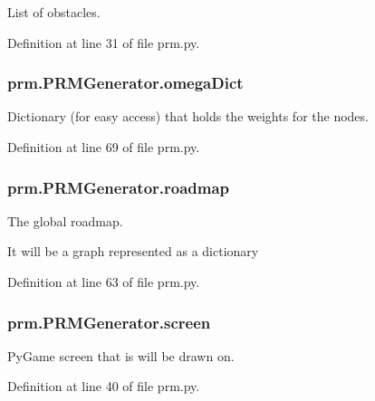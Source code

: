 List of obstacles. 



Definition at line 31 of file prm.\-py.

\hypertarget{classprm_1_1PRMGenerator_ad56b6bb5da1e474ab8a8099863207de3}{
\subsubsection[{omega\-Dict}]{\setlength{\rightskip}{0pt plus 5cm}prm.\-P\-R\-M\-Generator.\-omega\-Dict}}\label{classprm_1_1PRMGenerator_ad56b6bb5da1e474ab8a8099863207de3}


Dictionary (for easy access) that holds the weights for the nodes. 



Definition at line 69 of file prm.\-py.

\hypertarget{classprm_1_1PRMGenerator_a7fa851696426c3e1bbd7ff737cf33538}{
\subsubsection[{roadmap}]{\setlength{\rightskip}{0pt plus 5cm}prm.\-P\-R\-M\-Generator.\-roadmap}}\label{classprm_1_1PRMGenerator_a7fa851696426c3e1bbd7ff737cf33538}


The global roadmap. 

It will be a graph represented as a dictionary 

Definition at line 63 of file prm.\-py.

\hypertarget{classprm_1_1PRMGenerator_ab7fc7e3fa902029c3c3432ec0444be93}{
\subsubsection[{screen}]{\setlength{\rightskip}{0pt plus 5cm}prm.\-P\-R\-M\-Generator.\-screen}}\label{classprm_1_1PRMGenerator_ab7fc7e3fa902029c3c3432ec0444be93}


Py\-Game screen that is will be drawn on. 



Definition at line 40 of file prm.\-py.


